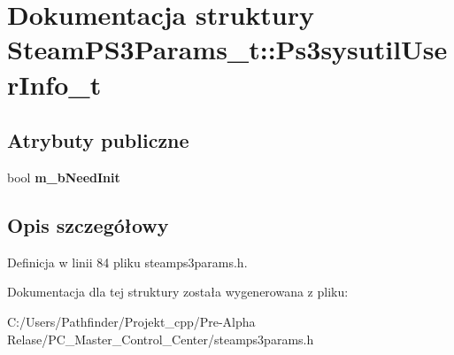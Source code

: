 \hypertarget{struct_steam_p_s3_params__t_1_1_ps3sysutil_user_info__t}{}\section{Dokumentacja struktury Steam\+P\+S3\+Params\+\_\+t\+:\+:Ps3sysutil\+User\+Info\+\_\+t}
\label{struct_steam_p_s3_params__t_1_1_ps3sysutil_user_info__t}
\subsection*{Atrybuty publiczne}
\begin{DoxyCompactItemize}
\item 
\mbox{\label{struct_steam_p_s3_params__t_1_1_ps3sysutil_user_info__t_af2be8c152949c103f63f39a3de892a04}} 
bool {\bfseries m\+\_\+b\+Need\+Init}
\end{DoxyCompactItemize}


\subsection{Opis szczegółowy}


Definicja w linii 84 pliku steamps3params.\+h.



Dokumentacja dla tej struktury została wygenerowana z pliku\+:\begin{DoxyCompactItemize}
\item 
C\+:/\+Users/\+Pathfinder/\+Projekt\+\_\+cpp/\+Pre-\/\+Alpha Relase/\+P\+C\+\_\+\+Master\+\_\+\+Control\+\_\+\+Center/steamps3params.\+h\end{DoxyCompactItemize}
